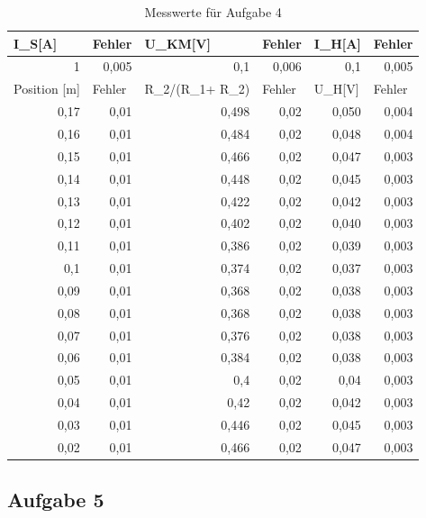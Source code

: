 \documentclass[12pt]{scrartcl}
\begin{document}
\begin{table}[htbp]
\caption{Messwerte für Aufgabe 4}
\begin{center}
\begin{tabular}{|r|r|r|r|r|r|}
\hline
\multicolumn{1}{|l|}{I\_S[A]} & \multicolumn{1}{l|}{Fehler} & \multicolumn{1}{l|}{U\_KM[V]} & \multicolumn{1}{l|}{Fehler} & \multicolumn{1}{l|}{I\_H[A]} & \multicolumn{1}{l|}{Fehler} \\ \hline
1 & 0,005 & 0,1 & 0,006 & 0,1 & 0,005 \\ \hline
\multicolumn{1}{|l|}{Position [m]} & \multicolumn{1}{l|}{Fehler} & \multicolumn{1}{l|}{R\_2/(R\_1+ R\_2)} & \multicolumn{1}{l|}{Fehler} & \multicolumn{1}{l|}{U\_H[V]} & \multicolumn{1}{l|}{Fehler} \\ \hline
0,17 & 0,01 & 0,498 & 0,02 & 0,050 & 0,004 \\ \hline
0,16 & 0,01 & 0,484 & 0,02 & 0,048 & 0,004 \\ \hline
0,15 & 0,01 & 0,466 & 0,02 & 0,047 & 0,003 \\ \hline
0,14 & 0,01 & 0,448 & 0,02 & 0,045 & 0,003 \\ \hline
0,13 & 0,01 & 0,422 & 0,02 & 0,042 & 0,003 \\ \hline
0,12 & 0,01 & 0,402 & 0,02 & 0,040 & 0,003 \\ \hline
0,11 & 0,01 & 0,386 & 0,02 & 0,039 & 0,003 \\ \hline
0,1 & 0,01 & 0,374 & 0,02 & 0,037 & 0,003 \\ \hline
0,09 & 0,01 & 0,368 & 0,02 & 0,038 & 0,003 \\ \hline
0,08 & 0,01 & 0,368 & 0,02 & 0,038 & 0,003 \\ \hline
0,07 & 0,01 & 0,376 & 0,02 & 0,038 & 0,003 \\ \hline
0,06 & 0,01 & 0,384 & 0,02 & 0,038 & 0,003 \\ \hline
0,05 & 0,01 & 0,4 & 0,02 & 0,04 & 0,003 \\ \hline
0,04 & 0,01 & 0,42 & 0,02 & 0,042 & 0,003 \\ \hline
0,03 & 0,01 & 0,446 & 0,02 & 0,045 & 0,003 \\ \hline
0,02 & 0,01 & 0,466 & 0,02 & 0,047 & 0,003\\ \hline
\end{tabular}
\end{center}
\label{aufgabe_4}
\end{table}

\newpage

\subsection{Aufgabe 5}
\end{document}
